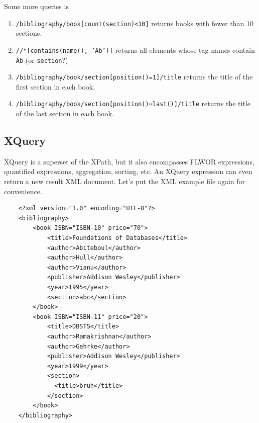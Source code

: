   \begin{example}
    Some more queries is 
    \begin{enumerate}
      \item \texttt{/bibliography/book[count(section)<10]} returns books with fewer than 10 sections. 
      \item \texttt{//*[contains(name(), 'Ab')]} returns all elements whose tag names contain \texttt{Ab} (or \texttt{section}?) 
      \item \texttt{/bibliography/book/section[position()=1]/title} returns the title of the first section in each book. 
      \item \texttt{/bibliography/book/section[position()=last()]/title} returns the title of the last section in each book.
    \end{enumerate}
  \end{example}

\subsection{XQuery}
  
  XQuery is a superset of the XPath, but it also encompasses FLWOR  expressions, quantified expressions, aggregation, sorting, etc. An XQuery expression can even return a new result XML document. Let's put the XML example file again for convenience. 

  \begin{lstlisting}
    <?xml version="1.0" encoding="UTF-8"?>
    <bibliography>
        <book ISBN="ISBN-10" price="70">
            <title>Foundations of Databases</title>
            <author>Abiteboul</author>
            <author>Hull</author>
            <author>Vianu</author>
            <publisher>Addison Wesley</publisher>
            <year>1995</year>
            <section>abc</section>
        </book>
        <book ISBN="ISBN-11" price="20">
            <title>DBSTS</title>
            <author>Ramakrishnan</author>
            <author>Gehrke</author>
            <publisher>Addison Wesley</publisher>
            <year>1999</year>
            <section>
              <title>bruh</title>
            </section>
        </book>
    </bibliography> 
  \end{lstlisting}

